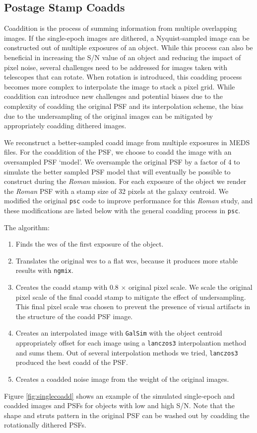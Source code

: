 \documentclass[fleqn,usenatbib]{mnras}
\begin{document}
\subsection{Postage Stamp Coadds}
\label{subsec:psc}
Coaddition is the process of summing information from multiple overlapping images. If the single-epoch images are dithered, a Nyquist-sampled image can be constructed out of multiple exposures of an object. While this process can also be beneficial in increasing the S/N value of an object and reducing the impact of pixel noise, several challenges need to be addressed for images taken with telescopes that can rotate. When rotation is introduced, this coadding process becomes more complex to interpolate the image to stack a pixel grid. While coaddition can introduce new challenges and potential biases due to the complexity of coadding the original PSF and its interpolation scheme, the bias due to the undersampling of the original images can be mitigated by appropriately coadding dithered images. 

We reconstruct a better-sampled coadd image from multiple exposures in MEDS files. For the coaddition of the PSF, we choose to coadd the image with an oversampled PSF `model'. We oversample the original PSF by a factor of 4 to simulate the better sampled PSF model that will eventually be possible to construct during the \emph{Roman} mission. For each exposure of the object we render the \emph{Roman} PSF with a stamp size of 32 pixels at the galaxy centroid. We modified the original \texttt{psc} code to improve performance for this \emph{Roman} study, and these modifications are listed below with the general coadding process in \texttt{psc}. 

The algorithm: 
\begin{enumerate}
    \setlength\itemsep{1em}
    \item Finds the wcs of the first exposure of the object.
    \item Translates the original wcs to a flat wcs, because it produces more stable results with \texttt{ngmix}.
    \item Creates the coadd stamp with 0.8 $\times$ original pixel scale. We scale the original pixel scale of the final coadd stamp to mitigate the effect of undersampling. This final pixel scale was chosen to prevent the presence of visual artifacts in the structure of the coadd PSF image. 
    \item Creates an interpolated image with \texttt{GalSim} with the object centroid appropriately offset for each image using a \texttt{lanczos3} interpolantion method and sums them. Out of several interpolation methods we tried, \texttt{lanczos3} produced the best coadd of the PSF.
    \item Creates a coadded noise image from the weight of the original images. 
\end{enumerate}
Figure \ref{fig:singlecoadd} shows an example of the simulated single-epoch and coadded images and PSFs for objects with low and high S/N. Note that the shape and struts pattern in the original PSF can be washed out by coadding the rotationally dithered PSFs. 
\end{document}
